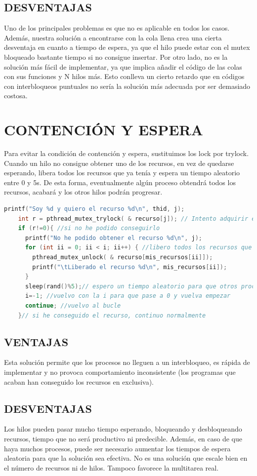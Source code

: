 \documentclass[10 pt,spanish]{article}  %
\begin{document}
\subsection{DESVENTAJAS}
Uno de los principales problemas es que no es aplicable en todos los casos. Además, nuestra solución a encontrarse con la cola llena crea una cierta desventaja en cuanto a tiempo de espera, ya que el hilo puede estar con el mutex bloqueado bastante tiempo si no consigue insertar. 
Por otro lado, no es la solución más fácil de implementar, ya que implica añadir el código de las colas con sus funciones y N hilos más. Esto conlleva un cierto retardo que en códigos con interbloqueos puntuales no sería la solución más adecuada por ser demasiado costosa.
\section{CONTENCIÓN Y ESPERA}
Para evitar la condición de contención y espera, sustituimos los lock por trylock. Cuando un hilo no consigue obtener uno de los recursos, en vez de quedarse esperando, libera todos los recursos que ya tenía y espera un tiempo aleatorio entre 0 y 5s. De esta forma, eventualmente algún proceso obtendrá todos los recursos, acabará y los otros hilos podrán progresar.
\begin{lstlisting}[language=C++,caption=Contención y espera]
    printf("Soy %d y quiero el recurso %d\n", thid, j);
    int r = pthread_mutex_trylock( & recurso[j]); // Intento adquirir el recurso
    if (r!=0){ //si no he podido conseguirlo
      printf("No he podido obtener el recurso %d\n", j);
      for (int ii = 0; ii < i; ii++) { //libero todos los recursos que tenia
        pthread_mutex_unlock( & recurso[mis_recursos[ii]]);
        printf("\tLiberado el recurso %d\n", mis_recursos[ii]);
      }
      sleep(rand()%5);// espero un tiempo aleatorio para que otros procesos acaben
      i=-1; //vuelvo con la i para que pase a 0 y vuelva empezar
      continue; //vuelvo al bucle
    }// si he conseguido el recurso, continuo normalmente
\end{lstlisting}
\subsection{VENTAJAS}
Esta solución permite que los procesos no lleguen a un interbloqueo, es rápida de implementar y no provoca comportamiento inconsistente (los programas que acaban han conseguido los recursos en exclusiva).
\subsection{DESVENTAJAS}
Los hilos pueden pasar mucho tiempo esperando, bloqueando y desbloqueando recursos, tiempo que no será productivo ni predecible. Además, en caso de que haya muchos procesos, puede ser necesario aumentar los tiempos de espera aleatoria para que la solución sea efectiva. No es una solución que escale bien en el número de recursos ni de hilos. Tampoco favorece la multitarea real.
\end{document}
